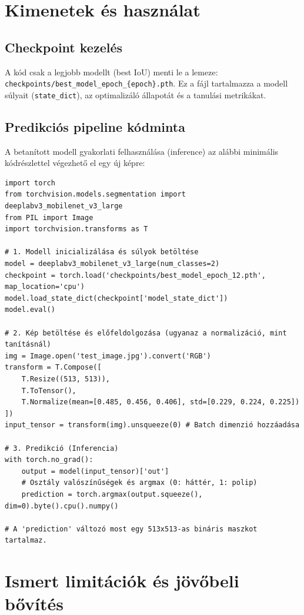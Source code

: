 \documentclass[12pt, a4paper]{report}
\begin{document}
\section{Kimenetek és használat}

\subsection{Checkpoint kezelés}
A kód csak a legjobb modellt (best IoU) menti le a lemeze: \texttt{checkpoints/best\_model\_epoch\_\{epoch\}.pth}. Ez a fájl tartalmazza a modell súlyait (\texttt{state\_dict}), az optimalizáló állapotát és a tanulási metrikákat.

\subsection{Predikciós pipeline kódminta}
A betanított modell gyakorlati felhasználása (inference) az alábbi minimális kódrészlettel végezhető el egy új képre:

\begin{verbatim}
import torch
from torchvision.models.segmentation import deeplabv3_mobilenet_v3_large
from PIL import Image
import torchvision.transforms as T

# 1. Modell inicializálása és súlyok betöltése
model = deeplabv3_mobilenet_v3_large(num_classes=2)
checkpoint = torch.load('checkpoints/best_model_epoch_12.pth', map_location='cpu')
model.load_state_dict(checkpoint['model_state_dict'])
model.eval()

# 2. Kép betöltése és előfeldolgozása (ugyanaz a normalizáció, mint tanításnál)
img = Image.open('test_image.jpg').convert('RGB')
transform = T.Compose([
    T.Resize((513, 513)),
    T.ToTensor(),
    T.Normalize(mean=[0.485, 0.456, 0.406], std=[0.229, 0.224, 0.225])
])
input_tensor = transform(img).unsqueeze(0) # Batch dimenzió hozzáadása

# 3. Predikció (Inferencia)
with torch.no_grad():
    output = model(input_tensor)['out']
    # Osztály valószínűségek és argmax (0: háttér, 1: polip)
    prediction = torch.argmax(output.squeeze(), dim=0).byte().cpu().numpy()

# A 'prediction' változó most egy 513x513-as bináris maszkot tartalmaz.
\end{verbatim}

\section{Ismert limitációk és jövőbeli bővítés}
\end{document}
